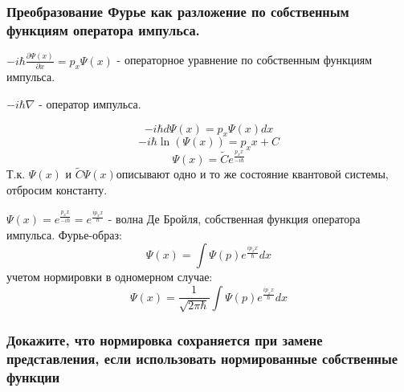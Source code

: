\subsubsection{Преобразование Фурье как разложение по собственным функциям оператора импульса.}

$-i\hbar \frac{\partial{\Psi(x)}}{\partial x}=p_x \Psi(x)$ - операторное уравнение по собственным функциям импульса.

$-i\hbar \nabla$ - оператор импульса.

$$-i\hbar d\Psi(x)=p_x \Psi(x)dx$$
$$-i\hbar \ln(\Psi(x))=p_xx +C$$
$$\Psi(x)=\widetilde{C} e^{\frac{p_xx}{-i\hbar}}$$
Т.к. $\Psi(x)$ и $\widetilde{C} \Psi(x)$описывают одно и то же состояние квантовой системы, отбросим константу. 

$\Psi(x)=e^{\frac{p_xx}{-i\hbar}}=e^{\frac{ip_xx}{\hbar}}$ - волна Де Бройля, собственная функция оператора импульса. Фурье-образ:
$$\Psi(x)=\int \Psi(p) e^{\frac{ip_xx}{\hbar}} dx$$
 учетом нормировки в одномерном случае:
 $$\Psi(x)=\frac{1}{\sqrt{2\pi \hbar}}\int \Psi(p) e^{\frac{ip_xx}{\hbar}} dx$$
\subsubsection{Докажите, что нормировка сохраняется при замене представления, если использовать нормированные собственные функции }

	